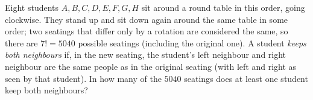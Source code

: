 Eight students $A,B,C,D,E,F,G,H$ sit around a round table in this order, going clockwise. They stand up and sit down again around the same table in some order; two seatings that differ only by a rotation are considered the same, so there are $7!=5040$ possible seatings (including the original one). A student \emph{keeps both neighbours} if, in the new seating, the student's left neighbour and right neighbour are the same people as in the original seating (with left and right as seen by that student). In how many of the $5040$ seatings does at least one student keep both neighbours?
